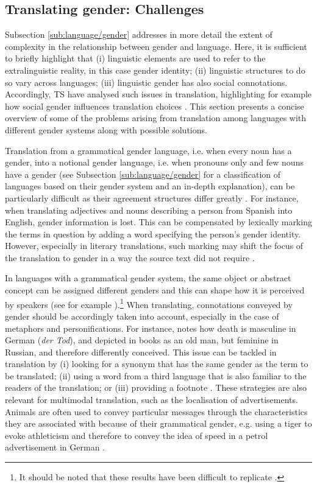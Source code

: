 \subsection{Translating gender: Challenges} \label{sub:translatinggender}

Subsection \ref{sub:language/gender} addresses in more detail the extent of complexity in the relationship between gender and language. Here, it is sufficient to briefly highlight that (i) linguistic elements are used to refer to the extralinguistic reality, in this case gender identity; (ii) linguistic structures to do so vary across languages; (iii) linguistic gender has also social connotations. Accordingly, TS have analysed such issues in translation, highlighting for example how social gender influences translation choices \citep{jakobson1959linguistic,nissen2002aspects,di2020grammatical}. This section presents a concise overview of some of the problems arising from translation among languages with different gender systems along with possible solutions. 

Translation from a grammatical gender language, i.e. when every noun has a gender, into a notional gender language, i.e. when pronouns only and few nouns have a gender (see Subsection \ref{sub:language/gender} for a classification of languages based on their gender system and an in-depth explanation), can be particularly difficult as their agreement structures differ greatly \citep[26]{nissen2002aspects}. For instance, when translating adjectives and nouns describing a person from Spanish into English, gender information is lost. This can be compensated by lexically marking the terms in question by adding a word specifying the person's gender identity. However, especially in literary translations, such marking may shift the focus of the translation to gender in a way the source text did not require \citep[27]{nissen2002aspects}. 

In languages with a grammatical gender system, the same object or abstract concept can be assigned different genders and this can shape how it is perceived by speakers (see for example \cite{boroditsky2003sex}).\footnote{It should be noted that these results have been difficult to replicate \citep{mickan2014key}.} When translating, connotations conveyed by gender should be accordingly taken into account, especially in the case of metaphors and personifications. For instance, \textcite[237]{jakobson1959linguistic} notes how death is masculine in German (\textit{der Tod}), and depicted in books as an old man, but feminine in Russian, and therefore differently conceived. This issue can be tackled in translation by (i) looking for a synonym that has the same gender as the term to be translated; (ii) using a word from a third language that is also familiar to the readers of the translation; or (iii) providing a footnote \citep[29]{nissen2002aspects}. These strategies are also relevant for multimodal translation, such as the localisation of advertisements. Animals are often used to convey particular messages through the characteristics they are associated with because of their grammatical gender, e.g. using a tiger to evoke athleticism and therefore to convey the idea of speed in a petrol advertisement in German \citep[368--369]{di2020grammatical}.

